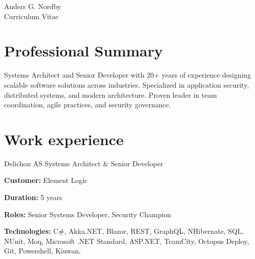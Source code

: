 \documentclass[10pt]{article} %
\begin{document}
\begin{paracol}{2} %


\parbox[top][0.12\textheight][c]{\linewidth}{ %
	\vspace{-0.04\textheight} %
	\centering %
	{\sffamily\Huge Anders G. Nordby}\\\medskip %
	{\Huge\color{headings}\cvtextfont Curriculum Vitae}
}


\section{Professional Summary}

Systems Architect and Senior Developer with 20+ years of experience designing scalable software solutions across industries. Specialized in application security, distributed systems, and modern architecture. Proven leader in team coordination, agile practices, and security governance.


\section{Work experience} 

{}
{Delichon AS} 
{Systems Architect \& Senior Developer} 
{
\textbf{Customer:} Element Logic

\textbf{Duration:} 5 years

\textbf{Roles:} Senior Systems Developer, Security Champion

\textbf{Technologies:} C\#, Akka.NET, Blazor, REST, GraphQL, NHibernate, SQL, NUnit, Moq, Microsoft .NET Standard, ASP.NET, TeamCity, Octopus Deploy, Git, Powershell, Kiuwan.
 
}
\end{paracol}
\end{document}
